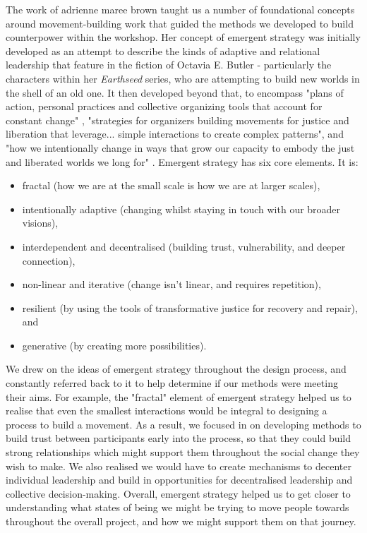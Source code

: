 The work of adrienne maree brown taught us a number of foundational concepts around movement-building work that guided the methods we developed to build counterpower within the workshop. Her concept of emergent strategy was initially developed as an attempt to describe the kinds of adaptive and relational leadership that feature in the fiction of Octavia E. Butler - particularly the characters within her \emph{Earthseed} series, who are attempting to build new worlds in the shell of an old one. It then developed beyond that, to encompass "plans of action, personal practices and collective organizing tools that account for constant change" \citep[23]{brown_emergent_2017}, "strategies for organizers building movements for justice and liberation that leverage... simple interactions to create complex patterns", and "how we intentionally change in ways that grow our capacity to embody the just and liberated worlds we long for" \citep[24]{brown_emergent_2017}. Emergent strategy has six core elements. It is:
\begin{itemize}
    \item fractal (how we are at the small scale is how we are at larger scales),
    \item intentionally adaptive (changing whilst staying in touch with our broader visions),
    \item interdependent and decentralised (building trust, vulnerability, and deeper connection),
    \item non-linear and iterative (change isn't linear, and requires repetition),
    \item resilient (by using the tools of transformative justice for recovery and repair), and
    \item generative (by creating more possibilities). \cite[50]{brown_emergent_2017}
\end{itemize}
We drew on the ideas of emergent strategy throughout the design process, and constantly referred back to it to help determine if our methods were meeting their aims. For example, the "fractal" element of emergent strategy helped us to realise that even the smallest interactions would be integral to designing a process to build a movement. As a result, we focused in on developing methods to build trust between participants early into the process, so that they could build strong relationships which might support them throughout the social change they wish to make. We also realised we would have to create mechanisms to decenter individual leadership and build in opportunities for decentralised leadership and collective decision-making. Overall, emergent strategy helped us to get closer to understanding what states of being we might be trying to move people towards throughout the overall project, and how we might support them on that journey.

